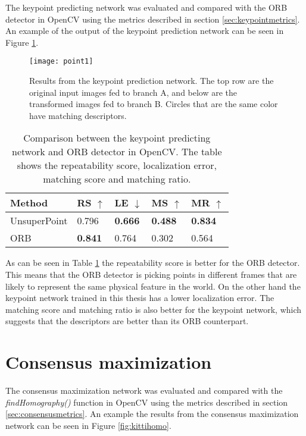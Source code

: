 The keypoint predicting network was evaluated and compared with the ORB detector in OpenCV using the metrics described in section \ref{sec:keypointmetrics}. An example of the output of the keypoint prediction network can be seen in Figure \ref{fig:point1}.

\begin{figure}[H]
	\centering
	\texttt{[image: point1]}
	\caption{Results from the keypoint prediction network. The top row are the original input images fed to branch A, and below are the transformed images fed to branch B. Circles that are the same color have matching descriptors.}
	\label{fig:point1}
\end{figure}

\begin{table}[H]
\centering
\begin{tabular}{|l|l|l|l|l|}
\hline
Method & RS $\uparrow$ & LE $\downarrow$ & MS $\uparrow$ & MR $\uparrow$ \\
\hline
UnsuperPoint & 0.796 & \textbf{0.666} & \textbf{0.488} & \textbf{0.834} \\
ORB & \textbf{0.841} & 0.764 & 0.302 & 0.564 \\
\hline
\end{tabular}
\caption{Comparison between the keypoint predicting network and ORB detector in OpenCV. The table shows the repeatability score, localization error, matching score and matching ratio.}
\label{table:pointsbenchmark}
\end{table}

As can be seen in Table \ref{table:pointsbenchmark} the repeatability score is better for the ORB detector. This means that the ORB detector is picking points in different frames that are likely to represent the same physical feature in the world. On the other hand the keypoint network trained in this thesis has a lower localization error. The matching score and matching ratio is also better for the keypoint network, which suggests that the descriptors are better than its ORB counterpart.

\section{Consensus maximization}
The consensus maximization network was evaluated and compared with the \textit{findHomography()} function in OpenCV using the metrics described in section \ref{sec:consensusmetrics}. An example the results from the consensus maximization network can be seen in Figure \ref{fig:kittihomo}.

